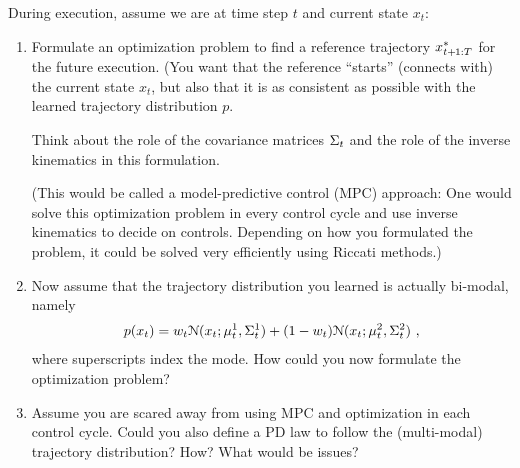 During execution, assume we are at time step $t$ and current state $x_t$:
\begin{enumerate}
\item Formulate an optimization problem to find a reference trajectory $x^*_{t\po:T}$ for the future execution. (You want that the reference ``starts'' (connects with) the current state $x_t$, but also that it is as consistent as possible with the learned trajectory distribution $p$.

Think about the role of the covariance matrices $\S_t$ and the role of the inverse kinematics in this formulation.

{\tiny (This would be called a model-predictive control (MPC) approach: One would solve this optimization problem in every control cycle and use inverse kinematics to decide on controls. Depending on how you formulated the problem, it could be solved very efficiently using Riccati methods.)

}


\item Now assume that the trajectory distribution you learned is actually bi-modal, namely
\begin{align}
p(x_t) = w_t \NN(x_t; \mu^1_t, \S^1_t) + (1-w_t) \NN(x_t; \mu^2_t, \S^2_t) ~, \end{align}
where superscripts index the mode. How could you now formulate the optimization problem?

\item Assume you are scared away from using MPC and optimization in each control cycle. Could you also define a PD law to follow the (multi-modal) trajectory distribution? How? What would be issues?
\end{enumerate}





